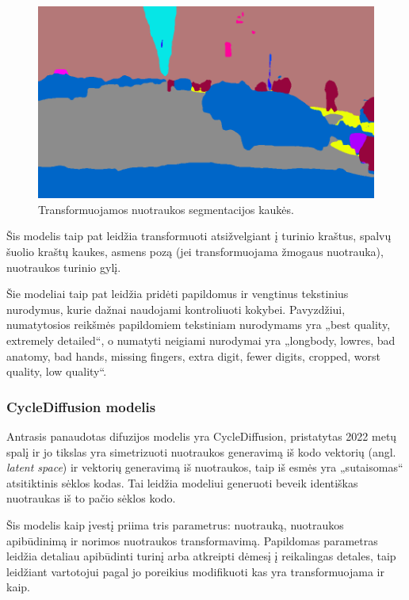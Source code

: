 \documentclass{VUMIFPSbakalaurinis}
\begin{document}
            \begin{figure}[H]
                \centering
                \includegraphics[scale=0.4287]{img/diffusion/controlnet/mask}
                \caption{Transformuojamos nuotraukos segmentacijos kaukės.}
                \label{img:mlp}
            \end{figure}

            Šis modelis taip pat leidžia transformuoti atsižvelgiant į turinio kraštus, spalvų šuolio kraštų kaukes, asmens pozą (jei transformuojama žmogaus nuotrauka), nuotraukos turinio gylį.

            Šie modeliai taip pat leidžia pridėti papildomus ir vengtinus tekstinius nurodymus, kurie dažnai naudojami kontroliuoti kokybei. Pavyzdžiui, numatytosios reikšmės papildomiem tekstiniam nurodymams yra „best quality, extremely detailed“, o numatyti neigiami nurodymai yra „longbody, lowres, bad anatomy, bad hands, missing fingers, extra digit, fewer digits, cropped, worst quality, low quality“.
        \subsubsection{CycleDiffusion modelis}
            Antrasis panaudotas difuzijos modelis yra CycleDiffusion, pristatytas 2022 metų spalį ir jo tikslas yra simetrizuoti nuotraukos generavimą iš kodo vektorių (angl. \emph{latent space}) ir vektorių generavimą iš nuotraukos, taip iš esmės yra „sutaisomas“ atsitiktinis sėklos kodas. Tai leidžia modeliui generuoti beveik identiškas nuotraukas iš to pačio sėklos kodo.

            Šis modelis kaip įvestį priima tris parametrus: nuotrauką, nuotraukos apibūdinimą ir norimos nuotraukos transformavimą. Papildomas parametras leidžia detaliau apibūdinti turinį arba atkreipti dėmesį į reikalingas detales, taip leidžiant vartotojui pagal jo poreikius modifikuoti kas yra transformuojama ir kaip.
\end{document}
